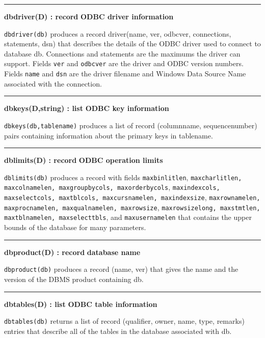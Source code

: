 \bigskip\hrule\vspace{0.1cm}
\noindent
{\bf dbdriver(D) : record } \hfill {\bf ODBC driver information}

\noindent
{}\texttt{dbdriver(db)} produces a record driver(name, ver,
odbcver, connections, statements, dsn) that describes the details of
the ODBC driver used to connect to database db. Connections
and statements are the maximums the driver can support. Fields
\texttt{ver} and \texttt{odbcver} are the driver and ODBC version
numbers. Fields \texttt{name} and \texttt{dsn} are the driver filename
and Windows Data Source Name associated with the connection.

\bigskip\hrule\vspace{0.1cm}
\noindent
{\bf dbkeys(D,string) : list } \hfill {\bf ODBC key information}

\noindent
{}\texttt{dbkeys(db,tablename)} produces a list of record
(columnname, sequencenumber) pairs containing information about the
primary keys in tablename.

\bigskip\hrule\vspace{0.1cm}
\noindent
{\bf dblimits(D) : record } \hfill {\bf ODBC operation limits}

\noindent
\texttt{dblimits(db)} produces a record with fields \texttt{maxbinlitlen},
\texttt{maxcharlitlen, maxcolnamelen, maxgroupbycols, maxorderbycols},
\texttt{maxindexcols, maxselectcols, maxtblcols, maxcursnamelen, maxindexsize},
\texttt{maxrownamelen, maxprocnamelen, maxqualnamelen, maxrowsize},
\texttt{maxrowsizelong, maxstmtlen, maxtblnamelen, maxselecttbls}, and
\texttt{maxusernamelen} that contains the upper bounds of the database
for many parameters.

\bigskip\hrule\vspace{0.1cm}
\noindent
{\bf dbproduct(D) : record } \hfill {\bf database name}

\noindent
\texttt{dbproduct(db)} produces a record (name, ver) that gives the name and the
version of the DBMS product containing db.

\bigskip\hrule\vspace{0.1cm}
\noindent
{\bf dbtables(D) : list } \hfill {\bf ODBC table information}

\noindent
\texttt{dbtables(db)} returns a list of record (qualifier, owner, name, type,
remarks) entries that describe all of the tables in the database
associated with db.

